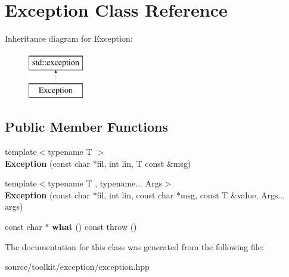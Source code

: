 \hypertarget{classException}{}\section{Exception Class Reference}
\label{classException}
Inheritance diagram for Exception\+:\begin{figure}[H]
\begin{center}
\leavevmode
\includegraphics[height=2.000000cm]{classException}
\end{center}
\end{figure}
\subsection*{Public Member Functions}
\begin{DoxyCompactItemize}
\item 
\mbox{\label{classException_afed32696646800f73466d765b785cf3c}} 
{\footnotesize template$<$typename T $>$ }\\{\bfseries Exception} (const char $\ast$fil, int lin, T const \&msg)
\item 
\mbox{\label{classException_a8be0f3d62682991241ae7a097d73f8fe}} 
{\footnotesize template$<$typename T , typename... Args$>$ }\\{\bfseries Exception} (const char $\ast$fil, int lin, const char $\ast$msg, const T \&value, Args... args)
\item 
\mbox{\label{classException_add710fe2bae3ac497ed60393eea35c91}} 
const char $\ast$ {\bfseries what} () const  throw ()
\end{DoxyCompactItemize}


The documentation for this class was generated from the following file\+:\begin{DoxyCompactItemize}
\item 
source/toolkit/exception/exception.\+hpp\end{DoxyCompactItemize}
